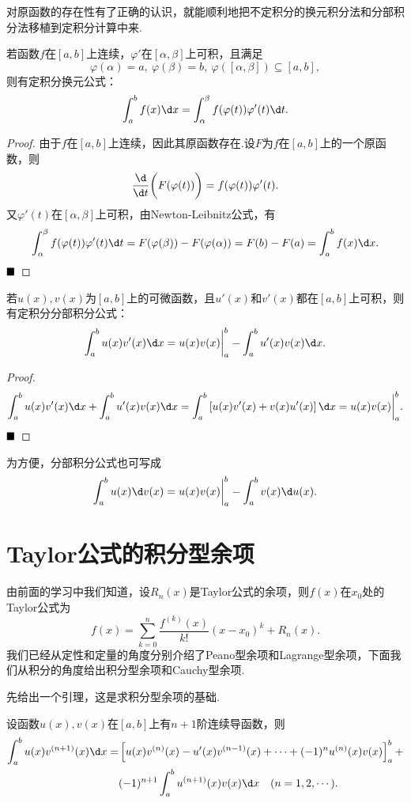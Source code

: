 对原函数的存在性有了正确的认识，就能顺利地把不定积分的换元积分法和分部积分法移植到定积分计算中来.
\begin{theorem}[换元积分法]
	若函数$f$在$\left[a,b\right]$上连续，$\varphi'$在$\left[\alpha,\beta\right]$上可积，且满足
	$$\varphi(\alpha)=a,\ \varphi(\beta)=b,\ \varphi(\left[\alpha,\beta\right])\subseteq\left[a,b\right],$$
	则有定积分换元公式：
	$$\int_{a}^{b}f(x)\d x=\int_{\alpha}^{\beta}f(\varphi(t))\varphi'(t)\d t.$$
\end{theorem}
\begin{proof}
	由于$f$在$\left[a,b\right]$上连续，因此其原函数存在.设$F$为$f$在$\left[a,b\right]$上的一个原函数，则
	$$\frac{\d}{\d t}\bigg(F(\varphi(t))\bigg)=f(\varphi(t))\varphi'(t).$$
	又$\varphi'(t)$在$\left[\alpha,\beta\right]$上可积，由Newton-Leibnitz公式，有
	$$\int_{\alpha}^{\beta}f(\varphi(t))\varphi'(t)\d t=F(\varphi(\beta))-F(\varphi(\alpha))=F(b)-F(a)=\int_{a}^{b}f(x)\d x.$$
	$\hfill\blacksquare$
\end{proof}
\begin{theorem}[分部积分法]
	若$u(x),v(x)$为$\left[a,b\right]$上的可微函数，且$u'(x)$和$v'(x)$都在$\left[a,b\right]$上可积，则有定积分分部积分公式：
	$$\int_{a}^{b}u(x)v'(x)\d x=u(x)v(x)\bigg|_{a}^{b}-\int_{a}^{b}u'(x)v(x)\d x.$$
\end{theorem}
\begin{proof}
	$$\int_{a}^{b}u(x)v'(x)\d x+\int_{a}^{b}u'(x)v(x)\d x=\int_{a}^{b}\left[u(x)v'(x)+v(x)u'(x)\right]\d x=u(x)v(x)\bigg|_{a}^{b}.$$
	$\hfill\blacksquare$
\end{proof}
\begin{remark}
	为方便，分部积分公式也可写成
	$$\int_{a}^{b}u(x)\d v(x)=u(x)v(x)\bigg|_{a}^{b}-\int_{a}^{b}v(x)\d u(x).$$
\end{remark}
\section{Taylor公式的积分型余项}
由前面的学习中我们知道，设$R_n(x)$是Taylor公式的余项，则$f(x)$在$x_0$处的Taylor公式为
$$f(x)=\sum_{k=0}^{n}\frac{f^{(k)}(x)}{k!}(x-x_0)^k+R_n(x).$$
我们已经从定性和定量的角度分别介绍了Peano型余项和Lagrange型余项，下面我们从积分的角度给出积分型余项和Cauchy型余项.

先给出一个引理，这是求积分型余项的基础.
\begin{lemma}[推广的分部积分公式]
	设函数$u(x),v(x)$在$\left[a,b\right]$上有$n+1$阶连续导函数，则
	\begin{align*}
		\int_{a}^{b}u(x)v^{(n+1)}(x)\d x=
		&\left[u(x)v^{(n)}(x)-u'(x)v^{(n-1)}(x)+\cdots+(-1)^nu^{(n)}(x)v(x)\right]_{a}^{b}+\\
		&(-1)^{n+1}\int_{a}^{b}u^{(n+1)}(x)v(x)\d x\quad(n=1,2,\cdots).
	\end{align*}
\end{lemma}

